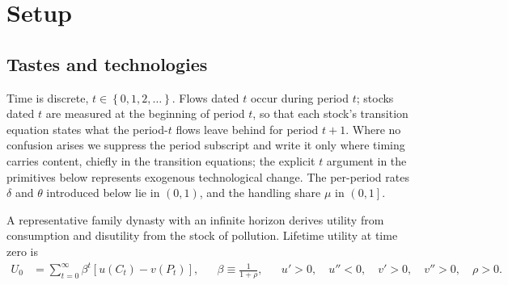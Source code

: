 \section{Setup}\label{sec:sp:setup}

\subsection{Tastes and technologies}
\label{sec:sp:setup:primitives}


 Time is discrete, $t\in\left\{0,1,2,\dots\right\}$. Flows dated $t$ occur during period $t$; stocks dated $t$ are measured at the beginning of period $t$, so that each stock's transition equation states what the period-$t$ flows leave behind for period $t+1$. Where no confusion arises we suppress the period subscript and write it only where timing carries content, chiefly in the transition equations; the explicit $t$ argument in the primitives below represents exogenous technological change. The per-period rates $\delta$ and $\theta$ introduced below lie in $\left(0,1\right)$, and the handling share $\mu$ in $\left(0,1\right]$.

 A representative family dynasty with an infinite horizon derives utility from consumption and disutility from the stock of pollution. Lifetime utility at time zero is
\begin{align}
U_0 &= \sum_{t=0}^{\infty}\beta^t\left[u(C_t)-v(P_t)\right],
&&
\beta\equiv\frac{1}{1+\rho},
&&
u'>0,\quad u''<0,\quad v'>0,\quad v''>0,\quad \rho>0.
\label{eq:sp:setup:utility}
\end{align}

